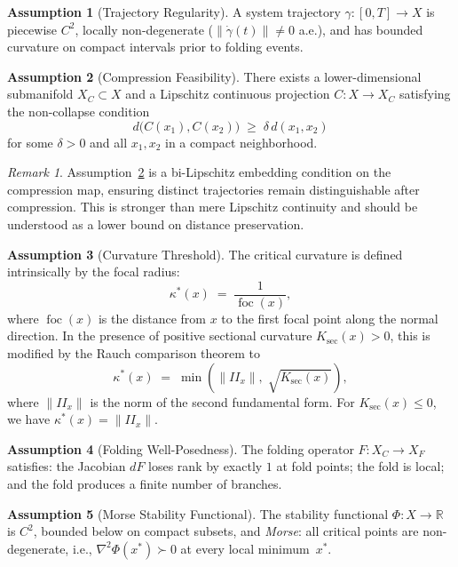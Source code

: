 \documentclass[12pt, oneside]{book}
\theoremstyle{plain}
\theoremstyle{definition}
\newtheorem{assumption}{Assumption}[section]
\theoremstyle{remark}
\newtheorem{remark}{Remark}[section]
\begin{document}
\begin{assumption}[Trajectory Regularity]\label{ass:traj}
A system trajectory $\gamma : [0,T] \to X$ is piecewise $C^2$,
locally non-degenerate ($\|\dot\gamma(t)\| \neq 0$ a.e.), and has
bounded curvature on compact intervals prior to folding events.
\end{assumption}

\begin{assumption}[Compression Feasibility]\label{ass:compress}
There exists a lower-dimensional submanifold $X_C \subset X$ and a
Lipschitz continuous projection $C : X \to X_C$ satisfying the
non-collapse condition
\[
d\bigl(C(x_1), C(x_2)\bigr) \;\ge\; \delta\, d(x_1, x_2)
\]
for some $\delta > 0$ and all $x_1, x_2$ in a compact neighborhood.
\end{assumption}

\begin{remark}
Assumption~\ref{ass:compress} is a bi-Lipschitz embedding condition
on the compression map, ensuring distinct trajectories remain
distinguishable after compression. This is stronger than mere Lipschitz
continuity and should be understood as a lower bound on distance
preservation.
\end{remark}

\begin{assumption}[Curvature Threshold]\label{ass:kappa}
The critical curvature is defined intrinsically by the focal radius:
\[
\kappa^*(x) \;=\; \frac{1}{\operatorname{foc}(x)},
\]
where $\operatorname{foc}(x)$ is the distance from $x$ to the first
focal point along the normal direction. In the presence of positive
sectional curvature $K_{\mathrm{sec}}(x) > 0$, this is modified by
the Rauch comparison theorem to
\[
\kappa^*(x) \;=\; \min\!\left(\|II_x\|,\;
  \sqrt{K_{\mathrm{sec}}(x)}\right),
\]
where $\|II_x\|$ is the norm of the second fundamental form.
For $K_{\mathrm{sec}}(x) \le 0$, we have $\kappa^*(x) = \|II_x\|$.
\end{assumption}

\begin{assumption}[Folding Well-Posedness]\label{ass:fold}
The folding operator $F : X_C \to X_F$ satisfies: the Jacobian $dF$
loses rank by exactly $1$ at fold points; the fold is local; and the
fold produces a finite number of branches.
\end{assumption}

\begin{assumption}[Morse Stability Functional]\label{ass:morse}
The stability functional $\Phi : X \to \mathbb{R}$ is $C^2$, bounded
below on compact subsets, and \emph{Morse}: all critical points are
non-degenerate, i.e., $\nabla^2\Phi(x^*) \succ 0$ at every local
minimum~$x^*$.
\end{assumption}
\end{document}
